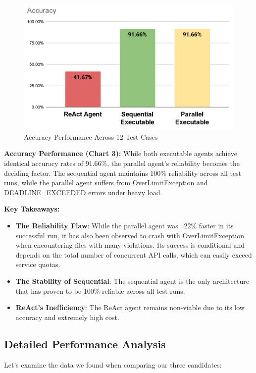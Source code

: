 \begin{spacing}{1.2}
\begin{figure}[H]
\centering
\includegraphics[scale=0.5]{images/accuracy.png}
\caption{Accuracy Performance Across 12 Test Cases}
\label{fig:accuracy_comparison}
\end{figure}

\textbf{Accuracy Performance (Chart 3):} While both executable agents achieve identical accuracy rates of 91.66\%, the parallel agent's reliability becomes the deciding factor. The sequential agent maintains 100\% reliability across all test runs, while the parallel agent suffers from OverLimitException and DEADLINE\_EXCEEDED errors under heavy load.

\textbf{Key Takeaways:}
\begin{itemize}
    \item \textbf{The Reliability Flaw}: While the parallel agent was ~22\% faster in its successful run, it has also been observed to crash with OverLimitException when encountering files with many violations. Its success is conditional and depends on the total number of concurrent API calls, which can easily exceed service quotas.
    \item \textbf{The Stability of Sequential}: The sequential agent is the only architecture that has proven to be 100\% reliable across all test runs.
    \item \textbf{ReAct's Inefficiency}: The ReAct agent remains non-viable due to its low accuracy and extremely high cost.
\end{itemize}

\subsection{Detailed Performance Analysis}
Let's examine the data we found when comparing our three candidates:


\end{spacing}
